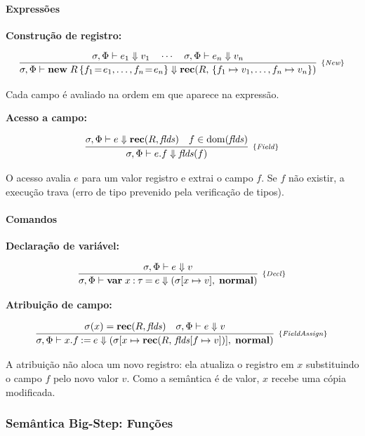 \paragraph{Expressões}

\textbf{Construção de registro:}

\[
  \infer[_{\{\mathit{New}\}}]
  {\sigma,\Phi \vdash \mathbf{new}\; R\,\{f_1\!=\!e_1,\ldots,f_n\!=\!e_n\}
  \Downarrow \mathbf{rec}(R,\,\{f_1 \mapsto v_1,\ldots,f_n \mapsto v_n\})}
  {\sigma,\Phi \vdash e_1 \Downarrow v_1
    \quad \cdots \quad
  \sigma,\Phi \vdash e_n \Downarrow v_n}
\]

Cada campo é avaliado na ordem em que aparece na expressão.

\textbf{Acesso a campo:}

\[
  \infer[_{\{\mathit{Field}\}}]
  {\sigma,\Phi \vdash e.f \Downarrow \mathit{flds}(f)}
  {\sigma,\Phi \vdash e \Downarrow \mathbf{rec}(R,\mathit{flds})
  \quad f \in \mathrm{dom}(\mathit{flds})}
\]

O acesso avalia \(e\) para um valor registro e extrai o campo \(f\).
Se \(f\) não existir, a execução trava (erro de tipo prevenido pela
verificação de tipos).

\paragraph{Comandos}

\textbf{Declaração de variável:}

\[
  \infer[_{\{\mathit{Decl}\}}]
  {\sigma,\Phi \vdash \mathbf{var}\; x \mathbin{:} \tau \mathbin{=} e
  \Downarrow (\sigma[x \mapsto v],\; \mathbf{normal})}
  {\sigma,\Phi \vdash e \Downarrow v}
\]

\textbf{Atribuição de campo:}

\[
  \infer[_{\{\mathit{FieldAssign}\}}]
  {\sigma,\Phi \vdash x.f \mathbin{:=} e
    \Downarrow (\sigma[x \mapsto \mathbf{rec}(R,\,\mathit{flds}[f
      \mapsto v])],\;
  \mathbf{normal})}
  {\sigma(x) = \mathbf{rec}(R,\mathit{flds})
  \quad \sigma,\Phi \vdash e \Downarrow v}
\]

A atribuição não aloca um novo registro: ela atualiza o registro em
\(x\) substituindo o campo \(f\) pelo novo valor \(v\). Como a
semântica é de valor, \(x\) recebe uma cópia modificada.

\subsubsection{Semântica Big-Step: Funções}

